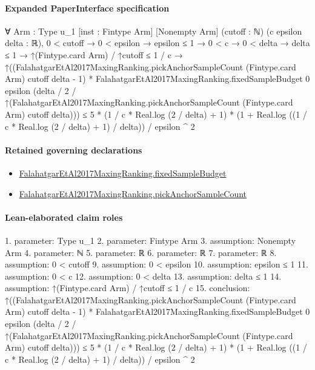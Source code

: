 \documentclass[10pt]{article}
\begin{document}
\paragraph{Expanded PaperInterface specification}
\begin{ReviewVerbatim}
∀ {Arm : Type u_1} [inst : Fintype Arm] [Nonempty Arm] (cutoff : ℕ) (c epsilon delta : ℝ),
  0 < cutoff →
    0 < epsilon →
      epsilon ≤ 1 →
        0 < c →
          0 < delta →
            delta ≤ 1 →
              ↑(Fintype.card Arm) / ↑cutoff ≤ 1 / c →
                ↑((FalahatgarEtAl2017MaxingRanking.pickAnchorSampleCount (Fintype.card Arm) cutoff delta - 1) *
                      FalahatgarEtAl2017MaxingRanking.fixedSampleBudget 0 epsilon
                        (delta / 2 /
                          ↑(FalahatgarEtAl2017MaxingRanking.pickAnchorSampleCount (Fintype.card Arm) cutoff delta))) ≤
                  5 * (1 / c * Real.log (2 / delta) + 1) * (1 + Real.log ((1 / c * Real.log (2 / delta) + 1) / delta)) /
                    epsilon ^ 2
\end{ReviewVerbatim}

\paragraph{Retained governing declarations}
\begin{itemize}\raggedright
\item \hyperlink{governing-declaration-4b4daf4bb2493573}{Falahatgar\allowbreak{}Et\allowbreak{}Al2017\allowbreak{}Maxing\allowbreak{}Ranking.\allowbreak{}fixed\allowbreak{}Sample\allowbreak{}Budget}
\item \hyperlink{governing-declaration-bfa3394b0e992f22}{Falahatgar\allowbreak{}Et\allowbreak{}Al2017\allowbreak{}Maxing\allowbreak{}Ranking.\allowbreak{}pick\allowbreak{}Anchor\allowbreak{}Sample\allowbreak{}Count}
\end{itemize}
\paragraph{Lean-elaborated claim roles}\begin{ReviewVerbatim}
1. parameter: Type u_1
2. parameter: Fintype Arm
3. assumption: Nonempty Arm
4. parameter: ℕ
5. parameter: ℝ
6. parameter: ℝ
7. parameter: ℝ
8. assumption: 0 < cutoff
9. assumption: 0 < epsilon
10. assumption: epsilon ≤ 1
11. assumption: 0 < c
12. assumption: 0 < delta
13. assumption: delta ≤ 1
14. assumption: ↑(Fintype.card Arm) / ↑cutoff ≤ 1 / c
15. conclusion: ↑((FalahatgarEtAl2017MaxingRanking.pickAnchorSampleCount (Fintype.card Arm) cutoff delta - 1) *
      FalahatgarEtAl2017MaxingRanking.fixedSampleBudget 0 epsilon
        (delta / 2 / ↑(FalahatgarEtAl2017MaxingRanking.pickAnchorSampleCount (Fintype.card Arm) cutoff delta))) ≤
  5 * (1 / c * Real.log (2 / delta) + 1) * (1 + Real.log ((1 / c * Real.log (2 / delta) + 1) / delta)) / epsilon ^ 2
\end{ReviewVerbatim}
\end{document}
